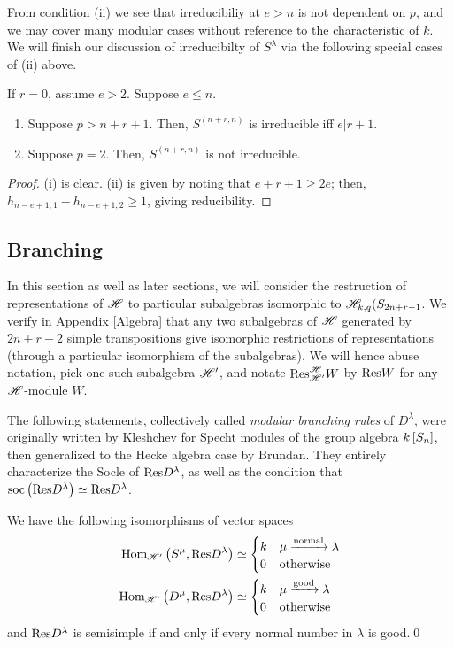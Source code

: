 \documentclass{amsart}
\begin{document}
  From condition (ii) we see that irreducibiliy at $e > n$ is not dependent on $p$, and we may cover many modular cases without reference to the characteristic of $k$.
  We will finish our discussion of irreducibilty of $S^\lambda$ via the following special cases of (ii) above.
  \begin{corollary}
    If $r = 0$, assume $e > 2$.
    Suppose $e \leq n$.
    \begin{enumerate}[label={(\roman*)}]
      \item Suppose $p > n + r + 1$. Then, $S^{(n + r,n)}$ is irreducible iff $e | r + 1$.
      \item Suppose $p = 2$. Then, $S^{(n+r,n)}$ is not irreducible.
    \end{enumerate}
  \end{corollary}
  \begin{proof}
    (i) is clear.
    (ii) is given by noting that $e + r + 1 \geq 2e$;
    then, $h_{n-e+1,1} - h_{n-e+1,2} \geq 1$, giving reducibility.
  \end{proof}
  \subsection{Branching}
  In this section as well as later sections, we will consider the restruction of representations of $\mathscr{H}$ to particular subalgebras isomorphic to $\mathscr{H}_{k,q}(S_{2n + r - 1}$.
  We verify in Appendix \ref{Algebra} that any two subalgebras of $\mathscr{H}$ generated by $2n + r - 2$ simple transpositions give isomorphic restrictions of representations (through a particular isomorphism of the subalgebras).
  We will hence abuse notation, pick one such subalgebra $\mathscr{H}'$, and notate $\text{Res}_{\mathscr{H}'}^{\mathscr{H}} W$ by $\text{Res} W$ for any $\mathscr{H}$-module $W$.

  The following statements, collectively called \emph{modular branching rules} of $D^\lambda$, were originally written by Kleshchev for Specht modules of the group algebra $k\left[ S_n \right]$, then generalized to the Hecke algebra case by Brundan.\cite{Kleshchev}\cite{Brundan} 
  They entirely characterize the Socle of $\text{Res} D^\lambda$, as well as the condition that $\text{soc}\left( \text{Res} D^\lambda \right) \simeq \text{Res} D^\lambda$.
  \begin{theorem}
    We have the following isomorphisms of vector spaces
    \begin{align*}
      \text{Hom}_{\mathscr{H}'}\left( S^\mu,\text{Res} D^\lambda \right) 
      &\simeq \begin{cases}
        k & \mu \xrightarrow{\text{normal}} \lambda\\
        0 & \text{otherwise}
      \end{cases}\\
      \text{Hom}_{\mathscr{H}'}\left( D^\mu,\text{Res} D^\lambda \right) 
      &\simeq \begin{cases}
        k & \mu \xrightarrow{\text{good}} \lambda\\
        0 & \text{otherwise}
      \end{cases}
    \end{align*}
    and $\text{Res} D^\lambda$ is semisimple if and only if every normal number in $\lambda$ is good.\qed
  \end{theorem}
\end{document}
